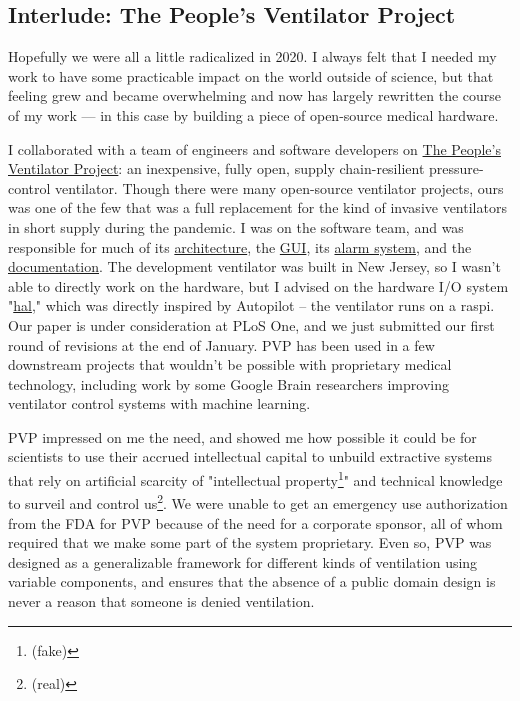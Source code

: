 \subsection{Interlude: The People's Ventilator Project}

Hopefully we were all a little radicalized in 2020. I always felt that I needed my work to have some practicable impact on the world outside of science, but that feeling grew and became overwhelming and now has largely rewritten the course of my work --- in this case by building a piece of open-source medical hardware.

\begin{done}
I collaborated with a team of engineers and software developers on \href{https://www.peoplesvent.org/en/latest/}{The People's Ventilator Project}\cite{lachancePVP1PeopleVentilator2020}: an inexpensive, fully open, supply chain-resilient pressure-control ventilator. Though there were many open-source ventilator projects, ours was one of the few that was a full replacement for the kind of invasive ventilators in short supply during the pandemic. I was on the software team, and was responsible for much of its \href{https://www.peoplesvent.org/en/latest/software/software_overview.html}{architecture}, the \href{https://www.peoplesvent.org/en/latest/software/gui/index.html}{GUI}, its \href{https://www.peoplesvent.org/en/latest/software/alarm/index.html}{alarm system}, and the \href{https://github.com/CohenLabPrinceton/pvp/tree/master/_docs}{documentation}. The development ventilator was built in New Jersey, so I wasn't able to directly work on the hardware, but I advised on the hardware I/O system "\href{https://github.com/CohenLabPrinceton/pvp/blob/master/pvp/io/hal.py}{hal}," which  was directly inspired by Autopilot -- the ventilator runs on a raspi. Our paper is under consideration at PLoS One, and we just submitted our first round of revisions at the end of January. PVP has been used in a few downstream projects that wouldn't be possible with proprietary medical technology, including work by some Google Brain researchers improving ventilator control systems with machine learning\cite{suoMachineLearningMechanical2022}.
\end{done}

PVP impressed on me the need, and showed me how possible it could be for scientists to use their accrued intellectual capital to unbuild extractive systems that rely on artificial scarcity of "intellectual property\footnote{(fake)}" and technical knowledge to surveil and control us\footnote{(real)}\cite{warkCapitalDeadThis2019}. We were unable to get an emergency use authorization from the FDA for PVP because of the need for a corporate sponsor, all of whom required that we make some part of the system proprietary. Even so, PVP was designed as a generalizable framework for different kinds of ventilation using variable components, and ensures that the absence of a public domain design is never a reason that someone is denied ventilation.
